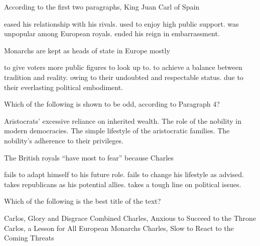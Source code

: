 \item According to the first two paragraphs, King Juan Carl of Spain
\begin{tasks}
	\task eased his relationship with his rivals.
	\task used to enjoy high public support.
	\task was unpopular among European royals.
	\task ended his reign in embarrassment.
\end{tasks}
\item Monarchs are kept as heads of state in Europe mostly
\begin{tasks}
	\task to give voters more public figures to look up to.
	\task to achieve a balance between tradition and reality.
	\task owing to their undoubted and respectable status.
	\task due to their everlasting political embodiment.
\end{tasks}
\item Which of the following is shown to be odd, according to Paragraph 4?
\begin{tasks}
	\task Aristocrats' excessive reliance on inherited wealth.
	\task The role of the nobility in modern democracies.
	\task The simple lifestyle of the aristocratic families.
	\task The nobility's adherence to their privileges.
\end{tasks}
\item The British royals ``have most to fear'' because Charles
\begin{tasks}
	\task fails to adapt himself to his future role.
	\task fails to change his lifestyle as advised.
	\task takes republicans as his potential allies.
	\task takes a tough line on political issues.
\end{tasks}
\item Which of the following is the best title of the text?
\begin{tasks}
	\task Carlos, Glory and Disgrace Combined
	\task Charles, Anxious to Succeed to the Throne
	\task Carlos, a Lesson for All European Monarchs
	\task Charles, Slow to React to the Coming Threats
\end{tasks}
